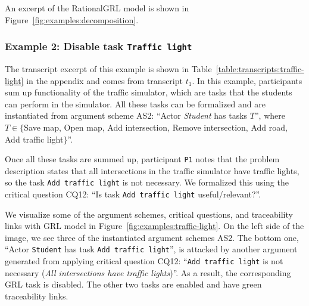 An excerpt of the RationalGRL model is shown in Figure~\ref{fig:examples:decomposition}. %


\subsubsection{Example 2: Disable task \texttt{Traffic light}}

The transcript excerpt of this example is shown in Table~\ref{table:transcripts:traffic-light} in the appendix and comes from transcript $t_1$. In this example, participants sum up functionality of the traffic simulator, which are tasks that the students can perform in the simulator. All these tasks can be formalized and are instantiated from  argument scheme AS2: ``Actor \emph{Student} has tasks $T$'', where $T\in\{$Save map, Open map, Add intersection, Remove intersection, Add road, Add traffic light$\}$''. 

Once all these tasks are summed up, participant \texttt{P1} notes that the problem description states that all intersections in the traffic simulator have traffic lights, so the task \texttt{Add traffic light} is not necessary. We formalized this using the critical question CQ12: ``Is task \texttt{Add traffic light} useful/relevant?''. %

We visualize some of the argument schemes, critical questions, and traceability links with GRL model in Figure~\ref{fig:examples:traffic-light}. On the left side of the image, we see three of the instantiated argument schemes AS2. The bottom one, ``Actor \texttt{Student} has task \texttt{Add traffic light}'', is attacked by another argument generated from applying critical question CQ12: ``\texttt{Add traffic light} is %
not necessary (\emph{All intersections have traffic lights})''. As a result, the corresponding GRL task is disabled. The other two tasks are enabled and have green traceability links.

